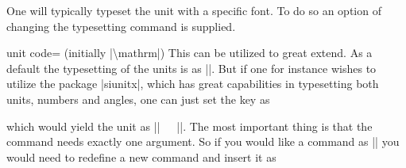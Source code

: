 One will typically typeset the unit with a specific font. To do so an option of changing the typesetting command is supplied.
\begin{pgfplotskey}{unit code= (initially |\textbackslash mathrm|)}
  This can be utilized to great extend. As a default the typesetting of the units is as ||. But if one for instance
  wishes to utilize the package |siunitx|, which has great capabilities in typesetting both units, numbers and angles, one can just set the key as
\begin{codeexample}
  \pgfplotsset{unit code=\si}
\end{codeexample}
  which would yield the unit as |\si{||}|. The most important thing is that the command needs exactly one argument. So if you
  would like a command as || you would need to redefine a new command and insert it as
\begin{codeexample}
  \newcommand\mathrmbf{1}{}
  \pgfplotsset{unit code=\mathrmbf}
\end{codeexample}
\end{pgfplotskey}



